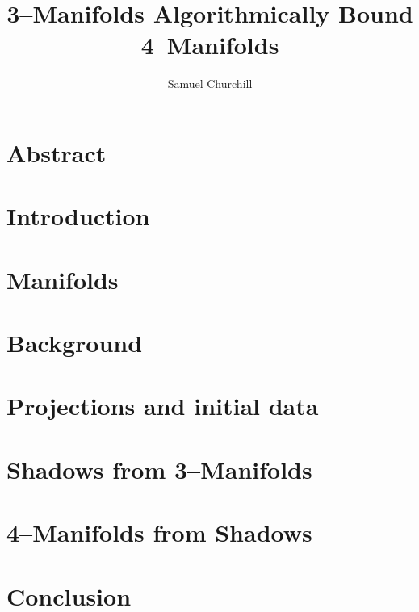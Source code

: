 \documentclass[12pt]{report}
\author{Samuel Churchill}
\title{3--Manifolds Algorithmically Bound 4--Manifolds}
\begin{document}
\maketitle

\chapter*{Abstract}

\tableofcontents

\chapter{Introduction}


\chapter{Manifolds}


\chapter{Background}


\chapter{Projections and initial data}
\label{cha:projection}


\chapter{Shadows from 3--Manifolds}
\label{cha:shadow}


\chapter{4--Manifolds from Shadows}
\label{cha:manifold}


\chapter{Conclusion}


% 

{}

\end{document}
